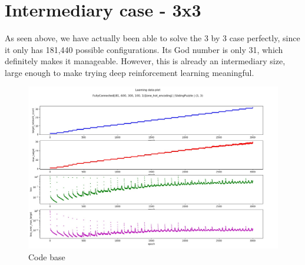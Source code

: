 \begin{three}
\end{three}
\\

\begin{five}
\end{five}
\\

\begin{seven}
\end{seven}
\\

\begin{nine}
\end{nine}
\\

\begin{eight}
\end{eight}
\\




\section{Intermediary case - 3x3}
\label{S33}
As seen above, we have actually been able to solve the 3 by 3 case perfectly, since it only has 181,440 possible configurations. Its God number is only 31, which definitely makes it manageable. However, this is already an intermediary size, large enough to make trying deep reinforcement learning meaningful.



\begin{landscape}
\begin{figure}[H]
\centering
\includegraphics[scale=0.5]{./Figures/33SPDeepReinforcementLearning.jpeg}
\caption[Codebase]{Code base}
\label{fig:Codebase}
\end{figure}
\end{landscape}


